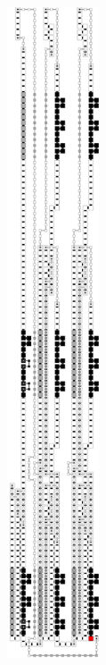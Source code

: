 \begin{figure}[H]
\begin{subfigure}[t]{0.3\textwidth}
        \end{subfigure}%
        ~
        \begin{subfigure}[t]{0.3\textwidth}
            \centering
            \includegraphics[width=0.3\textwidth]{seed/seed_overview_case2}

\end{subfigure}
\end{figure}
